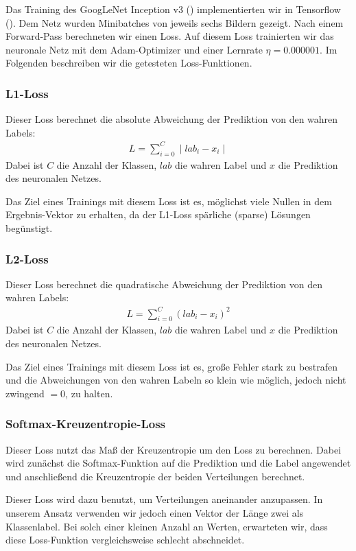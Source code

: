 	Das Training des GoogLeNet Inception v3 (\cite{inception}) implementierten wir in Tensorflow (\cite{tensorflow2015-whitepaper}). Dem Netz wurden Minibatches von jeweils sechs Bildern gezeigt. Nach einem Forward-Pass berechneten wir einen Loss. Auf diesem Loss trainierten wir das neuronale Netz mit dem Adam-Optimizer und einer Lernrate $\eta=0.000001$. Im Folgenden beschreiben wir die getesteten Loss-Funktionen.
	
\subsubsection{L1-Loss}

	Dieser Loss berechnet die absolute Abweichung der Prediktion von den wahren Labels:
	\begin{align*}
		L = \sum_{i = 0}^C \mid lab_i - x_i\mid
	\end{align*}
	Dabei ist $C$ die Anzahl der Klassen, $lab$ die wahren Label und $x$ die Prediktion des neuronalen Netzes.
	
	Das Ziel eines Trainings mit diesem Loss ist es, möglichst viele Nullen in dem Ergebnis-Vektor zu erhalten, da der L1-Loss spärliche (sparse) Lösungen begünstigt.

\subsubsection{L2-Loss}
	Dieser Loss berechnet die quadratische Abweichung der Prediktion von den wahren Labels:
	\begin{align*}
	L = \sum_{i = 0}^C ( lab_i - x_i)^2
	\end{align*}
	Dabei ist $C$ die Anzahl der Klassen, $lab$ die wahren Label und $x$ die Prediktion des neuronalen Netzes.
	
	Das Ziel eines Trainings mit diesem Loss ist es, große Fehler stark zu bestrafen und die Abweichungen von den wahren Labeln so klein wie möglich, jedoch nicht zwingend $=0$, zu halten.
	
\subsubsection{Softmax-Kreuzentropie-Loss}
	Dieser Loss nutzt das Maß der Kreuzentropie um den Loss zu berechnen. Dabei wird zunächst die Softmax-Funktion auf die Prediktion und die Label angewendet und anschließend die Kreuzentropie der beiden Verteilungen berechnet.
	
	Dieser Loss wird dazu benutzt, um Verteilungen aneinander anzupassen. In unserem Ansatz verwenden wir jedoch einen Vektor der Länge zwei als Klassenlabel. Bei solch einer kleinen Anzahl an Werten, erwarteten wir, dass diese Loss-Funktion vergleichsweise schlecht abschneidet.
		
